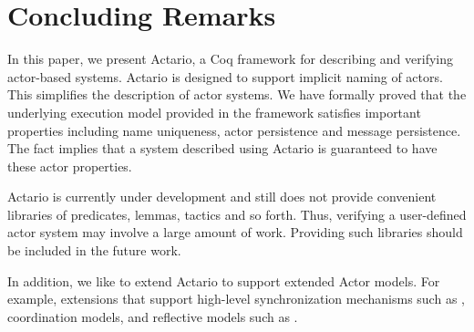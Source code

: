 \section{Concluding Remarks}
\label{sec:conclusion}

In this paper, we present Actario, a Coq framework for describing and
verifying actor-based systems. Actario is designed to support implicit
naming of actors. This simplifies the description of actor systems.
We have formally proved that the underlying execution model provided
in the framework satisfies important properties including name
uniqueness, actor persistence and message persistence.  The fact
implies that a system described using Actario is guaranteed to have
these actor properties.

Actario is currently under development and still does not provide
convenient libraries of predicates, lemmas, tactics and so
forth. Thus, verifying a user-defined actor system may involve a large
amount of work. Providing such libraries should be included in the
future work.

In addition, we like to extend Actario to support extended Actor
models. For example, extensions that support high-level
synchronization mechanisms such as \cite{De-Koster:2012aa},
coordination models\cite{Talcott:2011aa}, and reflective models such
as \cite{Watanabe:2013aa}.
